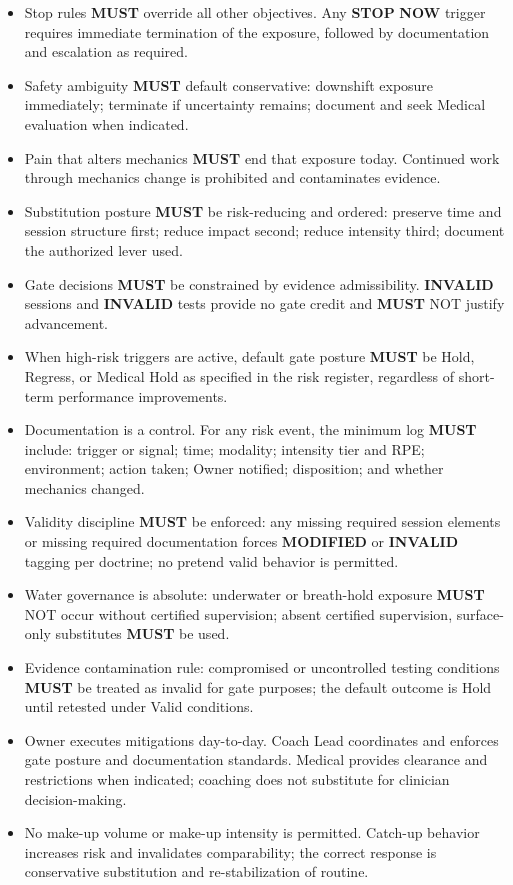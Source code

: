\documentclass[10pt]{article}
\begin{document}
\begin{itemize}
\item Stop rules \textbf{MUST} override all other objectives. Any \textbf{STOP} \textbf{NOW} trigger requires immediate termination of the exposure, followed by documentation and escalation as required.
\item Safety ambiguity \textbf{MUST} default conservative: downshift exposure immediately; terminate if uncertainty remains; document and seek Medical evaluation when indicated.
\item Pain that alters mechanics \textbf{MUST} end that exposure today. Continued work through mechanics change is prohibited and contaminates evidence.
\item Substitution posture \textbf{MUST} be risk-reducing and ordered: preserve time and session structure first; reduce impact second; reduce intensity third; document the authorized lever used.
\item Gate decisions \textbf{MUST} be constrained by evidence admissibility. \textbf{INVALID} sessions and \textbf{INVALID} tests provide no gate credit and \textbf{MUST} NOT justify advancement.
\item When high-risk triggers are active, default gate posture \textbf{MUST} be Hold, Regress, or Medical Hold as specified in the risk register, regardless of short-term performance improvements.
\item Documentation is a control. For any risk event, the minimum log \textbf{MUST} include: trigger or signal; time; modality; intensity tier and RPE; environment; action taken; Owner notified; disposition; and whether mechanics changed.
\item Validity discipline \textbf{MUST} be enforced: any missing required session elements or missing required documentation forces \textbf{MODIFIED} or \textbf{INVALID} tagging per doctrine; no pretend valid behavior is permitted.
\item Water governance is absolute: underwater or breath-hold exposure \textbf{MUST} NOT occur without certified supervision; absent certified supervision, surface-only substitutes \textbf{MUST} be used.
\item Evidence contamination rule: compromised or uncontrolled testing conditions \textbf{MUST} be treated as invalid for gate purposes; the default outcome is Hold until retested under Valid conditions.
\item Owner executes mitigations day-to-day. Coach Lead coordinates and enforces gate posture and documentation standards. Medical provides clearance and restrictions when indicated; coaching does not substitute for clinician decision-making.
\item No make-up volume or make-up intensity is permitted. Catch-up behavior increases risk and invalidates comparability; the correct response is conservative substitution and re-stabilization of routine.
\end{itemize}
\end{document}

